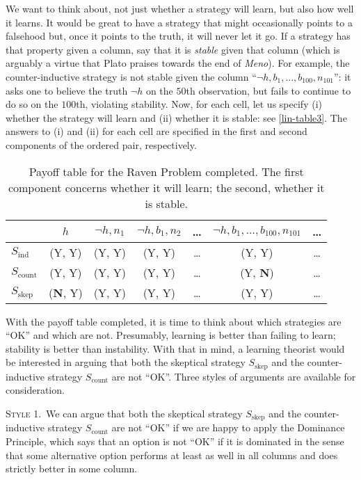 We want to think about, not just whether a strategy will learn, but also how well it learns. It would be great to have a strategy that might occasionally points to a falsehood but, once it points to the truth, it will never let it go. If a strategy has that property given a column, say that it is {\em stable} given that column (which is arguably a virtue that Plato praises towards the end of {\em Meno}). For example, the counter-inductive strategy is not stable given the column ``$\neg h, b_1, \dots, b_{100}, n_{101}$'': it asks one to believe the truth $\neg h$ on the $50$th observation, but fails to continue to do so on the $100$th, violating stability. Now, for each cell, let us specify (i) whether the strategy will learn and (ii) whether it is stable: see \autoref{lin-table3}. The answers to (i) and (ii) for each cell are specified in the first and second components of the ordered pair, respectively.
\begin{table}[ht]
\centering
\begin{tabular}{lcccccc}
	\hline
	& $h$ & $\neg h, n_1$ & $\neg h, b_1, n_2$ & \ldots & $\neg h, b_1, \ldots, b_{100}, n_{101}$ & \ldots \\
	\hline\hline
	$S_{\textrm{ind}}$ & (Y, Y) & (Y, Y) & (Y, Y) & \ldots & (Y, Y) & \ldots \\
  	$S_{\textrm{count}}$ & (Y, Y) & (Y, Y) & (Y, Y) & \ldots & (Y, \textbf{N}) & \ldots \\
		$S_{\textrm{skep}}$ & (\textbf{N}, Y) & (Y, Y) & (Y, Y) & \ldots & (Y, Y) & \ldots \\
	\hline
\end{tabular}
\caption{Payoff table for the Raven Problem completed. The first component concerns whether it will learn; the second, whether it is stable.}\label{lin-table3}
\end{table}


With the payoff table completed, it is time to think about which strategies are ``OK'' and which are not. Presumably, learning is better than failing to learn; stability is better than instability. With that in mind, a learning theorist would be interested in arguing that both the skeptical strategy $S_{\textrm{skep}}$ and the counter-inductive strategy $S_{\textrm{count}}$ are not ``OK''. Three styles of arguments are available for consideration. 

\textsc{Style 1.}\, We can argue that both the skeptical strategy $S_{\textrm{skep}}$ and the counter-inductive strategy $S_{\textrm{count}}$ are not ``OK'' if we are happy to apply the Dominance Principle, which says that an option is not ``OK'' if it is dominated in the sense that some alternative option performs at least as well in all columns and does strictly better in some column. 

